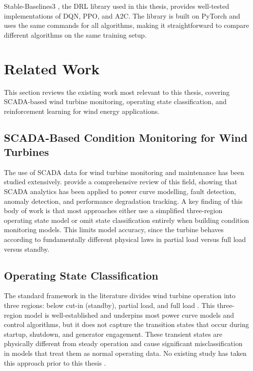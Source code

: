 Stable-Baselines3 \citep{raffin2021}, the DRL library used in this thesis, provides
well-tested implementations of DQN, PPO, and A2C. The library is built on PyTorch and
uses the same commands for all algorithms, making it straightforward to compare
different algorithms on the same training setup.


\section{Related Work}
\label{sec:bg:relatedwork}

This section reviews the existing work most relevant to this thesis, covering
SCADA-based wind turbine monitoring, operating state classification, and reinforcement
learning for wind energy applications.

\subsection*{SCADA-Based Condition Monitoring for Wind Turbines}

The use of SCADA data for wind turbine monitoring and maintenance has been studied
extensively. \citet{pandit2024} provide a comprehensive review of this field, showing
that SCADA analytics has been applied to power curve modelling, fault detection, anomaly
detection, and performance degradation tracking. A key finding of this body of work is
that most approaches either use a simplified three-region operating state model or
omit state classification entirely when building condition monitoring models. This
limits model accuracy, since the turbine behaves according to fundamentally different
physical laws in partial load versus full load versus standby.

\subsection*{Operating State Classification}

The standard framework in the literature divides wind turbine operation into three
regions: below cut-in (standby), partial load, and full load \citep{manwell2009}. This
three-region model is well-established and underpins most power curve models and control
algorithms, but it does not capture the transition states that occur during startup,
shutdown, and generator engagement. These transient states are physically different from
steady operation and cause significant misclassification in models that treat them as
normal operating data. No existing study has taken this approach prior to this thesis \citep{indrekvam2026}.

